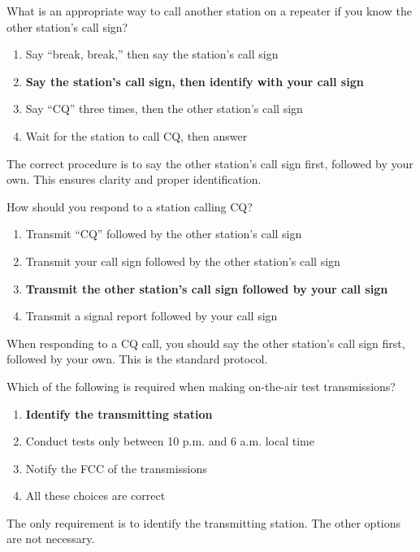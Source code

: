 \begin{tcolorbox}[colback=gray!10!white,colframe=black!75!black,title={T2A04}]
What is an appropriate way to call another station on a repeater if you know the other station's call sign?
\begin{enumerate}[label=\Alph*),noitemsep]
    \item Say “break, break,” then say the station's call sign
    \item \textbf{Say the station's call sign, then identify with your call sign}
    \item Say “CQ” three times, then the other station's call sign
    \item Wait for the station to call CQ, then answer
\end{enumerate}
\end{tcolorbox}
The correct procedure is to say the other station’s call sign first, followed by your own. This ensures clarity and proper identification.

\begin{tcolorbox}[colback=gray!10!white,colframe=black!75!black,title={T2A05}]
How should you respond to a station calling CQ?
\begin{enumerate}[label=\Alph*),noitemsep]
    \item Transmit “CQ” followed by the other station’s call sign
    \item Transmit your call sign followed by the other station’s call sign
    \item \textbf{Transmit the other station’s call sign followed by your call sign}
    \item Transmit a signal report followed by your call sign
\end{enumerate}
\end{tcolorbox}
When responding to a CQ call, you should say the other station’s call sign first, followed by your own. This is the standard protocol.

\begin{tcolorbox}[colback=gray!10!white,colframe=black!75!black,title={T2A06}]
Which of the following is required when making on-the-air test transmissions?
\begin{enumerate}[label=\Alph*),noitemsep]
    \item \textbf{Identify the transmitting station}
    \item Conduct tests only between 10 p.m. and 6 a.m. local time
    \item Notify the FCC of the transmissions
    \item All these choices are correct
\end{enumerate}
\end{tcolorbox}
The only requirement is to identify the transmitting station. The other options are not necessary.

